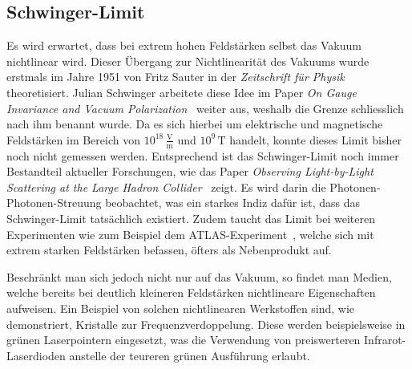 \subsection{Schwinger-Limit}\label{particles:section:lin-medium:schwinger}
Es wird erwartet, dass bei extrem hohen Feldstärken selbst das Vakuum nichtlinear wird.
Dieser Übergang zur Nichtlinearität des Vakuums wurde erstmals im Jahre 1951 von Fritz Sauter in der \emph{Zeitschrift für Physik}~\cite{particles:fritz_sauter} theoretisiert.
Julian Schwinger arbeitete diese Idee im Paper \emph{On Gauge Invariance and Vacuum Polarization}~\cite{particles:schwinger-limit} weiter aus, 
weshalb die Grenze schliesslich nach ihm benannt wurde.
Da es sich hierbei um elektrische und magnetische Feldstärken im Bereich von $10^{18}\,\frac{\text{V}}{\text{m}}$ und $10^9\,\text{T}$ handelt, 
konnte dieses Limit bisher noch nicht gemessen werden.
Entsprechend ist das Schwinger-Limit noch immer Bestandteil aktueller Forschungen, 
wie das Paper \emph{Observing Light-by-Light Scattering at the Large Hadron Collider}~\cite{particles:photon_photon_scattering} zeigt.
Es wird darin die Photonen-Photonen-Streuung beobachtet, was ein starkes Indiz dafür ist, 
dass das Schwinger-Limit tatsächlich existiert.
Zudem taucht das Limit bei weiteren Experimenten wie zum Beispiel dem ATLAS-Experiment~\cite{particles:atlas-experiment}, 
welche sich mit extrem starken Feldstärken befassen, öfters als Nebenprodukt auf.

Beschränkt man sich jedoch nicht nur auf das Vakuum, so findet man Medien, 
welche bereits bei deutlich kleineren Feldstärken nichtlineare Eigenschaften aufweisen.
Ein Beispiel von solchen nichtlinearen Werkstoffen sind, 
wie~\cite{particles:frequenzverdopplung} demonstriert, Kristalle zur Frequenzverdoppelung.
Diese werden beispielsweise in grünen Laserpointern eingesetzt, 
was die Verwendung von preiswerteren Infrarot-Laserdioden anstelle der teureren grünen Ausführung erlaubt.
